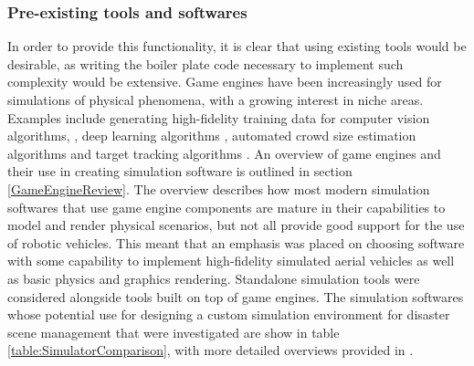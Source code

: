 \subsubsection{Pre-existing tools and softwares}
In order to provide this functionality, it is clear that using existing tools would be desirable, as writing the boiler plate code necessary to implement such complexity would be extensive. Game engines have been increasingly used for simulations of physical phenomena, with a growing interest in niche areas. Examples include generating high-fidelity training data for computer vision algorithms, \cite{QiuUnrealCV:Engine}, deep learning algorithms \cite{GaidonVirtualAnalysis}, automated crowd size estimation algorithms \cite{Lee2018DigitalCrowds} and target tracking algorithms \cite{Mueller2016ATracking}. An overview of game engines and their use in creating simulation software is outlined in section \ref{GameEngineReview}. The overview describes how most modern simulation softwares that use game engine components are mature in their capabilities to model and render physical scenarios, but not all provide good support for the use of robotic vehicles.
This meant that an emphasis was placed on choosing software with some capability to implement high-fidelity simulated aerial vehicles as well as basic physics and graphics rendering.
Standalone simulation tools were considered alongside tools built on top of game engines. The simulation softwares whose potential use for designing a custom simulation environment for disaster scene management that were investigated are show in table \ref{table:SimulatorComparison}, with more detailed overviews provided in \cite{Ebeid2018ASimulators}.

